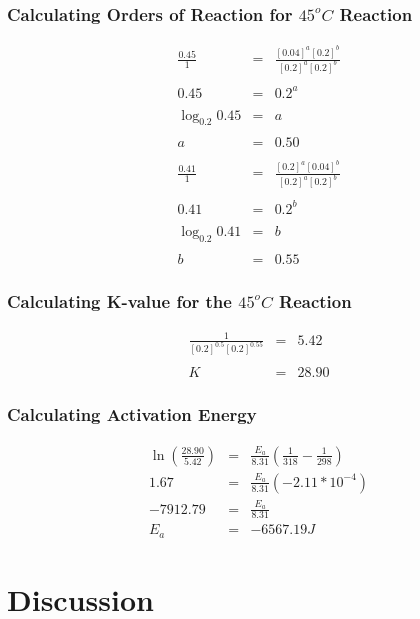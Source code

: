 \documentclass{article}
\begin{document}
\subsubsection*{Calculating Orders of Reaction for $45^o C$ Reaction}
\begin{eqnarray*}
	\frac{0.45}{1} &=& \frac{[0.04]^{a}[0.2]^{b}}{[0.2]^{a}[0.2]^{b}} \\\\
	0.45 &=& 0.2^{a} \\\\
	\log_{0.2} 0.45 &=& a \\\\
	a &=& 0.50 \\\\
	\frac{0.41}{1} &=& \frac{[0.2]^{a}[0.04]^{b}}{[0.2]^{a}[0.2]^{b}} \\\\
	0.41 &=& 0.2^{b} \\\\
	\log_{0.2} 0.41 &=& b \\\\
	b &=& 0.55 
\end{eqnarray*}
\subsubsection*{Calculating K-value for the $45^o C$ Reaction}
\begin{eqnarray*}
	\frac{1}{[0.2]^{0.5}[0.2]^{0.55}} &=& 5.42 \\\\
	K &=& 28.90
\end{eqnarray*}
\subsubsection*{Calculating Activation Energy} 
\begin{eqnarray*}
	\ln \left(\frac{28.90}{5.42}\right) &=& \frac{E_a}{8.31} \left(\frac{1}{318} - \frac{1}{298} \right)\\
	1.67 &=& \frac{E_{a}}{8.31}\left(-2.11*10^{-4}\right) \\
	-7912.79 &=& \frac{E_a}{8.31} \\
	E_a &=& -6567.19 J
\end{eqnarray*}
\section*{Discussion}%
\end{document}
